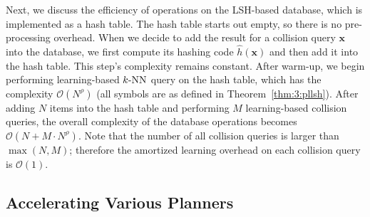 Next, we discuss the efficiency of operations on the LSH-based database, which is implemented as a hash table. The hash table starts out empty, so there is no pre-processing overhead. When we decide to add the result for a collision query $\mathbf x$ into the database, we first compute its hashing code $\hat{h}(\mathbf x)$ and then add it into the hash table. This step's complexity remains constant. After warm-up, we begin performing learning-based $k\text{-NN}$ query on the hash table, which has the complexity $\mathcal O(N^{\rho})$ (all symbols are as defined in Theorem~\ref{thm:3:pllsh}). After adding $N$ items into the hash table and performing $M$ learning-based collision queries, the overall complexity of the database operations becomes $\mathcal O(N + M \cdot N^{\rho})$. Note that the number of all collision queries is larger than $\max(N, M)$; therefore the amortized learning overhead on each collision query is $\mathcal O(1)$.

\subsection{Accelerating Various Planners}
\label{sec:3:planners:planner}


